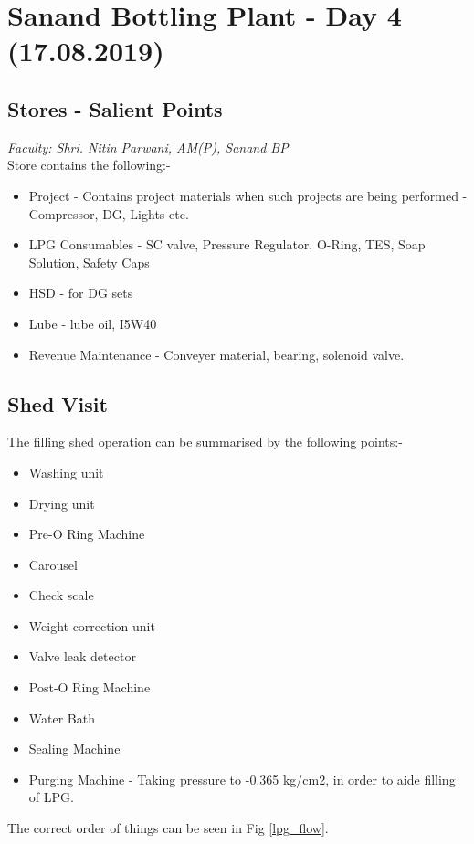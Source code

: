 \documentclass{report}
\begin{document}
	\section{Sanand Bottling Plant - Day 4 (17.08.2019)}
	\subsection{Stores - Salient Points}
	\textit{Faculty: Shri. Nitin Parwani, AM(P), Sanand BP}\\
	Store contains the following:-
	\begin{itemize}
		\item Project - Contains project materials when such projects are being performed - Compressor, DG, Lights etc.
		\item LPG Consumables - SC valve, Pressure Regulator, O-Ring, TES, Soap Solution, Safety Caps
		\item HSD - for DG sets
		\item Lube - lube oil, I5W40
		\item Revenue Maintenance - Conveyer material, bearing, solenoid valve.
	\end{itemize}
	
	\subsection{Shed Visit}
	The filling shed operation can be summarised by the following points:-
	\begin{itemize}
		\item Washing unit
		\item Drying unit
		\item Pre-O Ring Machine
		\item Carousel
		\item Check scale
		\item Weight correction unit
		\item Valve leak detector
		\item Post-O Ring Machine
		\item Water Bath
		\item Sealing Machine
		\item Purging Machine - Taking pressure to -0.365 kg/cm2, in order to aide filling of LPG.
	\end{itemize}
	The correct order of things can be seen in Fig \ref{lpg_flow}.
\end{document}
